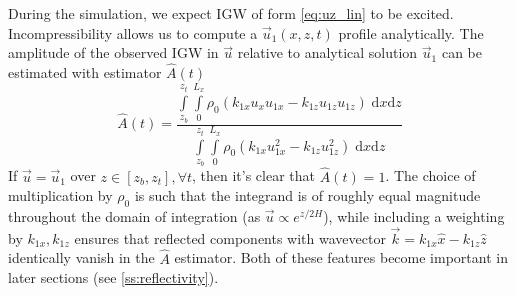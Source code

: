 \documentclass[
        fleqn,
        usenatbib,
    ]{mnras}
\newcommand*{\p}[1]{\left(#1\right)}
\begin{document}
During the simulation, we expect IGW of form \autoref{eq:uz_lin} to be
excited. Incompressibility allows us to compute a $\vec{u}_1(x, z, t)$ profile
analytically. The amplitude of the observed IGW in $\vec{u}$ relative to
analytical solution $\vec{u}_1$  can be estimated with estimator $\hat{A}(t)$
\begin{equation}
    \hat{A}(t) = \frac{\int\limits_{z_b}^{z_t}\int\limits_0^{L_x}
        \rho_0\p{k_{1x}u_xu_{1x} - k_{1z}u_{1z}u_{1z}}\;\mathrm{d}x\mathrm{d}z}
        {\int\limits_{z_b}^{z_t}\int\limits_0^{L_x}
        \rho_0\p{k_{1x}u_{1x}^2 - k_{1z}u_{1z}^2}\;\mathrm{d}x\mathrm{d}z}
        \label{eq:ahat_def}
\end{equation}
If $\vec{u} = \vec{u}_1$ over $z \in [z_b, z_t], \forall t$, then it's clear
that $\hat{A}(t) = 1$. The choice of multiplication by $\rho_0$ is such that the
integrand is of roughly equal magnitude throughout the domain of integration (as
$\vec{u} \propto e^{z/2H}$), while including a weighting by $k_{1x}, k_{1z}$
ensures that reflected components with wavevector $\vec{k} = k_{1x}\hat{x} -
k_{1z}\hat{z}$ identically vanish in the $\hat{A}$ estimator. Both of these
features become important in later sections (see \autoref{ss:reflectivity}).
\end{document}
